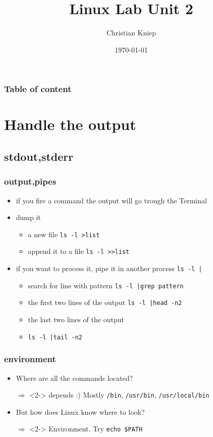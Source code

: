 \documentclass[draft,handout]{beamer}
\author{Christian Kniep}
\newcommand{\code}[1]{\colorbox{lGray}{\texttt{#1}}}
\begin{document}
\title[Linux Lab Unit 2]{Linux Lab Unit 2}  
\date[\today]{\today} 

\begin{frame}
	\titlepage
\end{frame} 

\begin{frame}
	\frametitle{Table of content}
	\tableofcontents
\end{frame} 

\section{Handle the output}
    \subsection{stdout,stderr}
        \begin{frame}
			\frametitle{output,pipes}
			\begin{itemize}
                \item<1-> if you fire a command the output will go trough the Terminal
                \item<2-> dump it
                \begin{itemize}
                    \item<2-> a new file \code{ls -l \textgreater list}
                    \item<3-> append it to a file \code{ls -l \textgreater\textgreater list}
                \end{itemize}
                \item<4-> if you want to process it, pipe it in another process \code{ls -l |}
                \begin{itemize}
                    \item<4-> search for line with pattern \code{ls -l |grep pattern}
                    \item<5-> the first two lines of the output \code{ls -l |head -n2}
                    \item<6-> the last two lines of the output 
                    \item<7-> \code{ls -l |tail -n2}
                \end{itemize}
                
            \end{itemize}
        \end{frame}
        \begin{frame}
			\frametitle{environment}
			\begin{itemize}
                \item<1-> Where are all the commands located?
                \item[$\Rightarrow$]<2-> depends :) Mostly \code{/bin}, \code{/usr/bin}, \code{/usr/local/bin}
                \item<3-> But how does Linux know where to look?
                \item[$\Rightarrow$]<2-> Environment. Try \code{echo \$PATH}
            \end{itemize}
        \end{frame}
    
\end{document}
